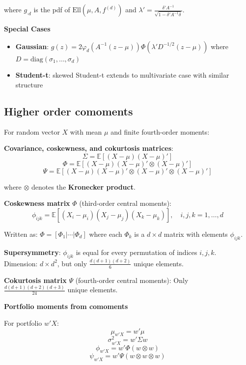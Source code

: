 \documentclass[12pt,a4paper]{article}
\begin{document}
where $g_{\cdot d}$ is the pdf of $\text{Ell}(\mu, A, f^{(d)})$ and $\lambda' = \frac{\delta' A^{-1}}{\sqrt{1 - \delta' A^{-1}\delta}}$.

\textbf{Special Cases}

\begin{itemize}
    \item \textbf{Gaussian}: $g(z) = 2\varphi_d(A^{-1}(z-\mu))\Phi(\lambda'D^{-1/2}(z-\mu))$ where $D = \text{diag}(\sigma_1, \ldots, \sigma_d)$
    \item \textbf{Student-t}: skewed Student-t extends to multivariate case with similar structure
\end{itemize}

\subsection{Higher order comoments}

For random vector $X$ with mean $\mu$ and finite fourth-order moments:

\textbf{Covariance, coskewness, and cokurtosis matrices}:
\[
\Sigma = \mathbb{E}[(X - \mu)(X - \mu)']
\]
\[
\Phi = \mathbb{E}[(X - \mu)(X - \mu)' \otimes (X - \mu)']
\]
\[
\Psi = \mathbb{E}[(X - \mu)(X - \mu)' \otimes (X - \mu)' \otimes (X - \mu)']
\]

where $\otimes$ denotes the \textbf{Kronecker product}.

\vspace{0.5em}

\textbf{Coskewness matrix} $\Phi$ (third-order central moments):
\[
\phi_{ijk} = \mathbb{E}[(X_i - \mu_i)(X_j - \mu_j)(X_k - \mu_k)], \quad i,j,k = 1,\ldots,d
\]

Written as: $\Phi = [\Phi_1 | \cdots | \Phi_d]$ where each $\Phi_k$ is a $d \times d$ matrix with elements $\phi_{ijk}$.

\textbf{Supersymmetry}: $\phi_{ijk}$ is equal for every permutation of indices $i, j, k$. Dimension: $d \times d^2$, but only $\frac{d(d+1)(d+2)}{6}$ unique elements.

\vspace{0.5em}

\textbf{Cokurtosis matrix} $\Psi$ (fourth-order central moments): Only $\frac{d(d+1)(d+2)(d+3)}{24}$ unique elements.

\vspace{0.5em}

\textbf{Portfolio moments from comoments}

For portfolio $w'X$:
\[
\mu_{w'X} = w'\mu
\]
\[
\sigma^2_{w'X} = w'\Sigma w
\]
\[
\phi_{w'X} = w'\Phi(w \otimes w)
\]
\[
\psi_{w'X} = w'\Psi(w \otimes w \otimes w)
\]
\end{document}
